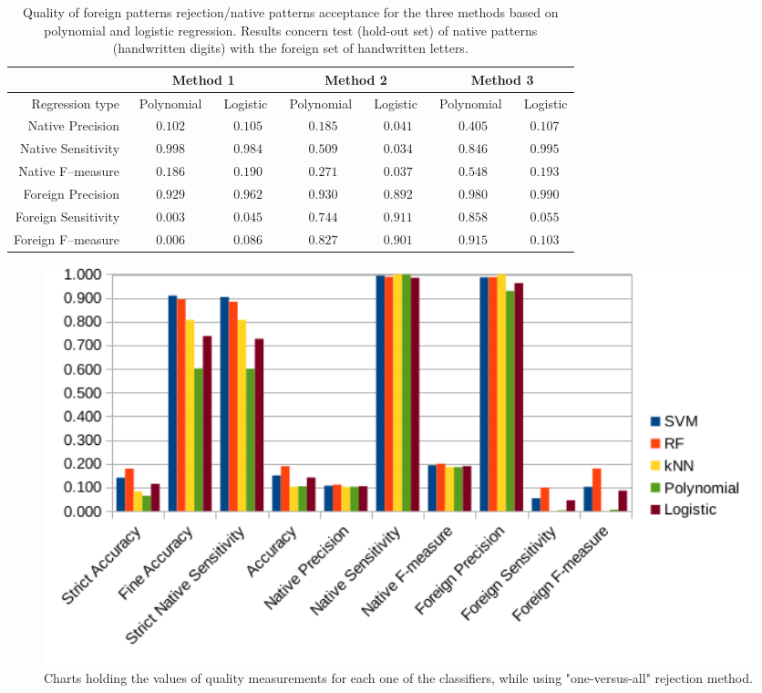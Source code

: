 \documentclass{llncs}
\begin{document}
\begin{table}[!b]
	\vspace{-1pt}
	\centering
	\caption{Quality of foreign patterns rejection/native patterns acceptance for the three methods based on polynomial and logistic regression. Results concern test (hold-out set) of native patterns (handwritten digits) with the foreign set of handwritten letters.}
	\vspace{-6pt}
	\setlength{\tabcolsep}{3pt}
	\renewcommand{\arraystretch}{1}
	{\footnotesize
		\begin{tabular}{|r||c|c||c|c||c|c|}
			\hline
			& \multicolumn{2}{c||}{Method 1} & \multicolumn{2}{c||}{Method 2} & \multicolumn{2}{c|}{Method 3}\\
			\hline
			Regression type & $\;\;$Polynomial$\;\;$ & $\,$Logistic$\;\;$ & $\,$Polynomial$\;\;$ & $\,$Logistic$\;\;$ & $\,$Polynomial$\;\;$ & $\,$Logistic  \\
			\hline
			Native Precision       & $0.102$ & $0.105$ & $0.185$ & $0.041$ & $0.405$ & $0.107$ \\
			Native Sensitivity & $0.998$ & $0.984$ & $0.509$ & $0.034$ & $0.846$ & $0.995$ \\
			Native F--measure & $0.186$ & $0.190$ & $0.271$ & $0.037$ & $0.548$ & $0.193$ \\
			Foreign Precision & $0.929$ & $0.962$ & $0.930$ & $0.892$ & $0.980$ & $0.990$ \\
			Foreign Sensitivity & $0.003$ & $0.045$ & $0.744$ & $0.911$ & $0.858$ & $0.055$ \\
			Foreign F--measure & $0.006$ & $0.086$ & $0.827$ & $0.901$ & $0.915$ & $0.103$ \\			
			\hline			
		\end{tabular}	
	}
	\vspace{-0pt}
	\label{tab:results_rejection_regression}
\end{table}

\begin{figure}[!htb]
	\centering
	\includegraphics[width=1.0\textwidth]{_Figures/Method1_Chart.png}
	\caption{ Charts holding the values of quality measurements for each one of the classifiers, while using "one-versus-all" rejection method.  }
	\label{fig:resultcharts}
\end{figure}
\end{document}
